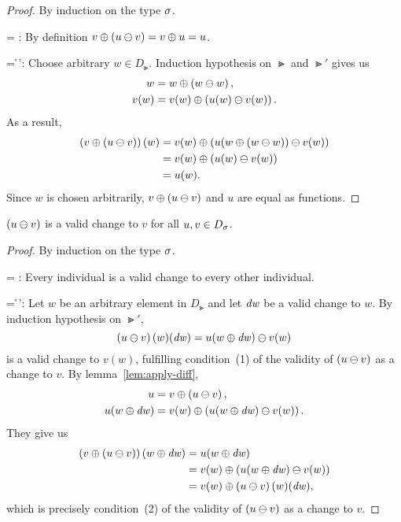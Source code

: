 \begin{proof}
By induction on the type $\sigma$.

\Case \Gs = \Gi:
By definition
$
  \Apply{\Diff* u v}v
= \Apply uv
= u
$.

\Case \Gs = \Gt \r \Gt': Choose arbitrary $w\in D_\Gt$. Induction
hypothesis on $\Gt$ and $\Gt'$ gives us
\begin{align*}
w    & = \Apply{\Diff* w w}w,\\
v(w) & = \Apply{\Diff*{u(w)}{v(w)}}{v(w)}.
\end{align*}
As a result,
\begin{align*}
\Apply*{\Diff* u v}v(w)
& = \Apply{\Diff*{u(\Apply{\Diff*ww}w)}{v(w)}}{v(w)}\\
& = \Apply{\Diff*{u(w)}{v(w)}}{v(w)}\\
& = u(w).
\end{align*}
Since $w$ is chosen arbitrarily, $\Apply{\Diff* u v}v$ and
$u$ are equal as functions.
\end{proof}

\begin{lemma}
\label{lem:diff-is-valid}
$\Diff* u v$ is a valid change to $v$ for all $u,v\in D_\sigma$.
\end{lemma}

\begin{proof}
By induction on the type $\sigma$.

\Case \Gs = \Gi: Every individual is a valid change to every
other individual.

\Case \Gs = \Gt \r \Gt': Let $w$ be an arbitrary element in
$D_\Gt$ and let $\mathit{dw}$ be a valid change to $w$. By induction
hypothesis on $\Gt'$,
\[
\Diff* u v(w)(\D w) = \Diff{u(\Apply{\D w}w)}{v(w)}
\]
is a valid change to $v(w)$, fulfilling condition~(1) of the
validity of $\Diff*uv$ as a change to $v$. By
lemma~\ref{lem:apply-diff},
\begin{align*}
u & = \Apply{\Diff*uv}v,\\
u(\Apply{\D w}w)
& = \Apply{\Diff*{u(\Apply{\D w}w)}{v(w)}}{v(w)}.
\end{align*}
They give us
\begin{align*}
    \Apply*{\Diff*uv}v(\Apply{\D w}w)
& = u(\Apply{\D w}w)\\
& = \Apply{\Diff*{u(\Apply{\D w}w)}{v(w)}}{v(w)}\\
& = \Apply{\Diff*uv(w)(\D w)}{v(w)},
\end{align*}
which is precisely condition~(2) of the validity of
$\Diff*uv$ as a change to $v$.
\end{proof}

